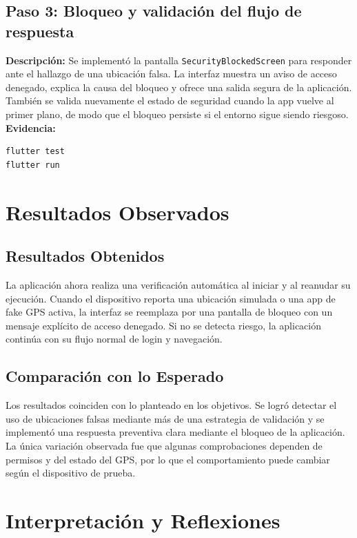 \documentclass[12pt, a4paper]{article}
\begin{document}
\subsection*{Paso 3: Bloqueo y validación del flujo de respuesta}
\textbf{Descripción:} Se implementó la pantalla \texttt{SecurityBlockedScreen} para responder ante el hallazgo de una ubicación falsa. La interfaz muestra un aviso de acceso denegado, explica la causa del bloqueo y ofrece una salida segura de la aplicación. También se valida nuevamente el estado de seguridad cuando la app vuelve al primer plano, de modo que el bloqueo persiste si el entorno sigue siendo riesgoso.\\[4pt]
\textbf{Evidencia:}
\begin{lstlisting}[caption={Comandos ejecutados en el Paso 3}]
flutter test
flutter run
\end{lstlisting}

\section{Resultados Observados}

\subsection*{Resultados Obtenidos}
La aplicación ahora realiza una verificación automática al iniciar y al reanudar su ejecución. Cuando el dispositivo reporta una ubicación simulada o una app de fake GPS activa, la interfaz se reemplaza por una pantalla de bloqueo con un mensaje explícito de acceso denegado. Si no se detecta riesgo, la aplicación continúa con su flujo normal de login y navegación.

\subsection*{Comparación con lo Esperado}
Los resultados coinciden con lo planteado en los objetivos. Se logró detectar el uso de ubicaciones falsas mediante más de una estrategia de validación y se implementó una respuesta preventiva clara mediante el bloqueo de la aplicación. La única variación observada fue que algunas comprobaciones dependen de permisos y del estado del GPS, por lo que el comportamiento puede cambiar según el dispositivo de prueba.

\section{Interpretación y Reflexiones}
\end{document}
